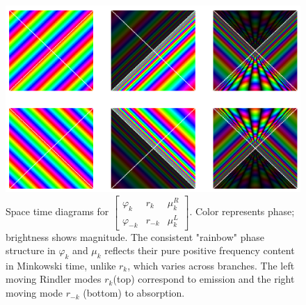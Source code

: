 \documentclass[12pt,a4paper]{article}
\begin{document}
\begin{figure}[h]
\centering
\includegraphics[scale=0.5]{unruh_mode_rainbow.png}
\captionsetup{width=0.9\textwidth}
\caption{Space time diagrams for $\left[\begin{array}{ccc} \varphi_k & r_k & \mu^R_k \\ \varphi_{-k} & r_{-k} & \mu^L_k \end{array} \right]$. Color represents phase; brightness shows magnitude. The consistent "rainbow" phase structure in $\varphi_k$ and $\mu_k$ reflects their pure positive frequency content in Minkowski time, unlike $r_k$, which varies across branches. The left moving Rindler modes $r_k$(top) correspond to emission and the right moving mode $r_{-k}$ (bottom) to absorption.}
\label{unruh_rainbow}
\end{figure}
\end{document}
